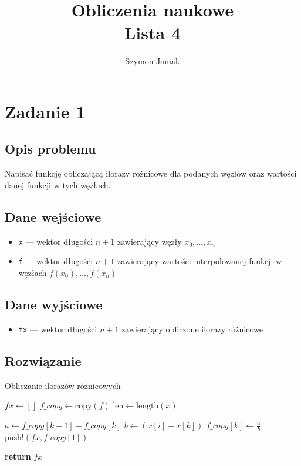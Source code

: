 \documentclass{article}
\title{%
	Obliczenia naukowe \\
	\large Lista 4}
\author{Szymon Janiak}
\begin{document}
\maketitle

\section*{Zadanie 1}
\subsection*{Opis problemu}
	Napisać funkcję obliczającą ilorazy różnicowe dla podanych węzłów oraz wartości danej funkcji w tych węzłach.
\subsection*{Dane wejściowe}\label{1.in-data}
	\begin{itemize}
		\item \texttt{x} — wektor długości $n+1$ zawierający węzły $x_0,\dots,x_n$
		\item \texttt{f} — wektor długości $n+1$ zawierający wartości interpolowanej funkcji w węzłach $f(x_0), \dots, f(x_n)$
	\end{itemize}
\subsection*{Dane wyjściowe}
	\begin{itemize}
	    \item \texttt{fx} — wektor długości $n+1$ zawierający obliczone ilorazy różnicowe
	\end{itemize}
\subsection*{Rozwiązanie}
	\begin{algorithm}
	\caption{Obliczanie ilorazów różnicowych}
	\begin{algorithmic}[1]
	        \State $fx \gets []$
	        \State $f\_copy \gets \text{copy}(f)$
	        \State $\text{len} \gets \text{length}(x)$
	        
	                \State $a \gets f\_copy[k + 1] - f\_copy[k]$
	                \State $b \gets (x[i] - x[k])$
	                \State $f\_copy[k] \gets \frac{a}{b}$
	            \EndFor
	            \State $\text{push!}(fx, f\_copy[1])$
	        \EndFor
	        
	        \State \textbf{return} $fx$
	    \EndFunction
	\end{algorithmic}
	\end{algorithm}
\end{document}

